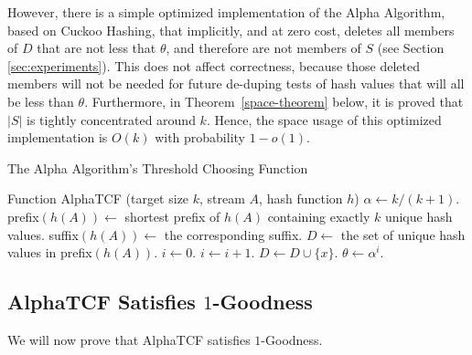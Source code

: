 \documentclass{article}
\begin{document}
However, there is a simple optimized implementation of the Alpha
Algorithm, based on Cuckoo Hashing, that implicitly, and at zero cost,
deletes all members of $D$ that are not less that $\theta$, and therefore
are not members of $S$ (see Section \ref{sec:experiments}). This does not affect correctness, because those 
deleted members will not be needed for future de-duping tests of hash
values that will all be less than $\theta$. Furthermore, in Theorem~\ref{space-theorem} below, it
is proved that $|S|$ is tightly concentrated around $k$. Hence, the
space usage of this optimized implementation is $O(k)$ with probability $1-o(1)$.


\begin{algorithm}[t]
\caption{The Alpha Algorithm's Threshold Choosing Function}\label{code:alpha-tcf}
\begin{algorithmic}[1]{\footnotesize
\STATE Function AlphaTCF (target size $k$, stream $A$, hash function $h$)
\STATE $\alpha \leftarrow k/(k+1)$.
\STATE prefix$(h(A)) \leftarrow$ shortest prefix of $h(A)$ containing exactly
       $k$ unique hash values.
\STATE suffix$(h(A)) \leftarrow$ the corresponding suffix.
\STATE $D \leftarrow$ the set of unique hash values in prefix$(h(A))$.  \STATE $i \leftarrow 0$.
  \label{code:alpha-tcf-line-8}
  \label{code:alpha-tcf-line-9}
\STATE $i \leftarrow i + 1$. \label{code:alpha-tcf-line-10}
\STATE $D \leftarrow D \cup \{x\}$.
\ENDIF
\ENDIF
\ENDFOR
\RETURN $\theta \leftarrow \alpha^{i}$. \label{code:alpha-tcf-line-15}
}\end{algorithmic}
\end{algorithm}



\subsection{AlphaTCF Satisfies $1$-Goodness}\label{sec:alpha-sat}

We will now prove that AlphaTCF satisfies $1$-Goodness.
\end{document}
